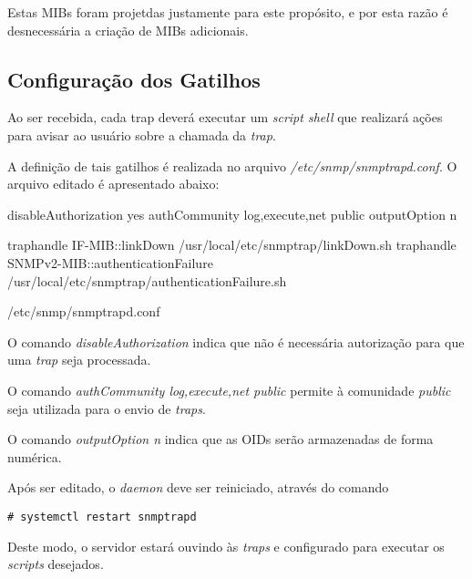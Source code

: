 \documentclass{article}
\begin{document}
Estas MIBs foram projetdas justamente para este propósito, e por esta razão é desnecessária a criação de MIBs adicionais.

\subsection{Configuração dos Gatilhos}

\par Ao ser recebida, cada trap deverá executar um \textit{script shell} que realizará ações para avisar ao usuário sobre a chamada da \textit{trap}.

\par A definição de tais gatilhos é realizada no arquivo \textit{/etc/snmp/snmptrapd.conf}. O arquivo editado é apresentado abaixo:

\begin{program}
\begin{myverb}
disableAuthorization yes
authCommunity log,execute,net public
outputOption n

traphandle IF-MIB::linkDown /usr/local/etc/snmptrap/linkDown.sh
traphandle SNMPv2-MIB::authenticationFailure /usr/local/etc/snmptrap/authenticationFailure.sh 
\end{myverb}
\caption{/etc/snmp/snmptrapd.conf}
\end{program}

\par O comando \textit{disableAuthorization} indica que não é necessária autorização para que uma \textit{trap} seja processada.
\par O comando \textit{authCommunity log,execute,net public} permite à comunidade \textit{public} seja utilizada para o envio de \textit{traps}.
\par O comando \textit{outputOption n} indica que as OIDs serão armazenadas de forma numérica.

\pagebreak

\par Após ser editado, o \textit{daemon} deve ser reiniciado, através do comando

\begin{commandline}
\begin{verbatim}
# systemctl restart snmptrapd
\end{verbatim}
\end{commandline}

\par Deste modo, o servidor estará ouvindo às \textit{traps} e configurado para executar os \textit{scripts} desejados.
\end{document}
